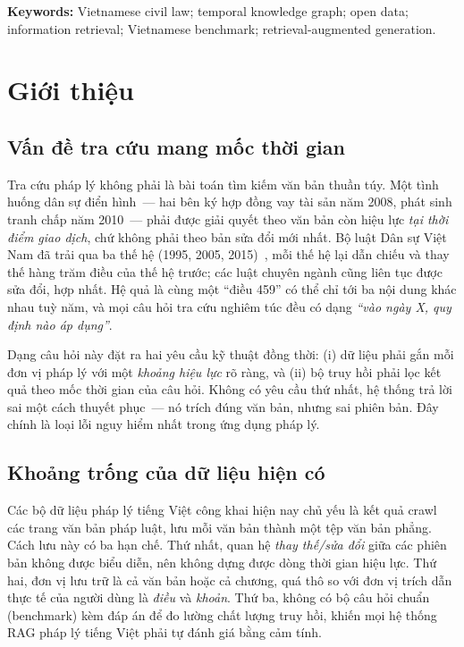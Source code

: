 \documentclass[12pt,a4paper]{report}
\renewcommand{\_}{\textunderscore\allowbreak}
\begin{document}
\vspace{0.3cm}
\noindent\textbf{Keywords:} Vietnamese civil law; temporal knowledge graph; open data; information retrieval; Vietnamese benchmark; retrieval-augmented generation.

\tableofcontents
\newpage


\chapter{Giới thiệu}\label{ch:gioithieu}

\section{Vấn đề tra cứu mang mốc thời gian}

Tra cứu pháp lý không phải là bài toán tìm kiếm văn bản thuần túy. Một tình huống dân sự điển hình~--- hai bên ký hợp đồng vay tài sản năm 2008, phát sinh tranh chấp năm 2010~--- phải được giải quyết theo văn bản còn hiệu lực \emph{tại thời điểm giao dịch}, chứ không phải theo bản sửa đổi mới nhất. Bộ luật Dân sự Việt Nam đã trải qua ba thế hệ (1995, 2005, 2015)~\cite{blds1995,blds2005,blds2015}, mỗi thế hệ lại dẫn chiếu và thay thế hàng trăm điều của thế hệ trước; các luật chuyên ngành cũng liên tục được sửa đổi, hợp nhất. Hệ quả là cùng một ``điều 459'' có thể chỉ tới ba nội dung khác nhau tuỳ năm, và mọi câu hỏi tra cứu nghiêm túc đều có dạng \emph{``vào ngày X, quy định nào áp dụng''}.

Dạng câu hỏi này đặt ra hai yêu cầu kỹ thuật đồng thời: (i) dữ liệu phải gắn mỗi đơn vị pháp lý với một \emph{khoảng hiệu lực} rõ ràng, và (ii) bộ truy hồi phải lọc kết quả theo mốc thời gian của câu hỏi. Không có yêu cầu thứ nhất, hệ thống trả lời sai một cách thuyết phục~--- nó trích đúng văn bản, nhưng sai phiên bản. Đây chính là loại lỗi nguy hiểm nhất trong ứng dụng pháp lý.

\section{Khoảng trống của dữ liệu hiện có}

Các bộ dữ liệu pháp lý tiếng Việt công khai hiện nay chủ yếu là kết quả crawl các trang văn bản pháp luật, lưu mỗi văn bản thành một tệp văn bản phẳng. Cách lưu này có ba hạn chế. Thứ nhất, quan hệ \emph{thay thế/sửa đổi} giữa các phiên bản không được biểu diễn, nên không dựng được dòng thời gian hiệu lực. Thứ hai, đơn vị lưu trữ là cả văn bản hoặc cả chương, quá thô so với đơn vị trích dẫn thực tế của người dùng là \emph{điều} và \emph{khoản}. Thứ ba, không có bộ câu hỏi chuẩn (benchmark) kèm đáp án để đo lường chất lượng truy hồi, khiến mọi hệ thống RAG pháp lý tiếng Việt phải tự đánh giá bằng cảm tính.
\end{document}
